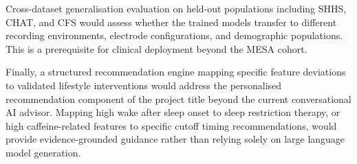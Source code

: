 Cross-dataset generalisation evaluation on held-out populations including SHHS, CHAT, and CFS would assess whether the trained models transfer to different recording environments, electrode configurations, and demographic populations. This is a prerequisite for clinical deployment beyond the MESA cohort.

Finally, a structured recommendation engine mapping specific feature deviations to validated lifestyle interventions would address the personalised recommendation component of the project title beyond the current conversational AI advisor. Mapping high wake after sleep onset to sleep restriction therapy, or high caffeine-related features to specific cutoff timing recommendations, would provide evidence-grounded guidance rather than relying solely on large language model generation.
